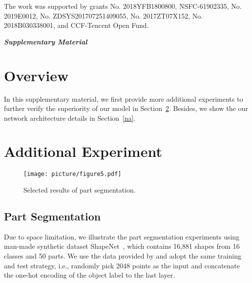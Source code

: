 \documentclass[10pt,twocolumn,letterpaper]{article}
\begin{document}
	
	
	{ The work was supported by grants No. 2018YFB1800800, NSFC-61902335, No. 2019E0012, No. ZDSYS201707251409055, No. 2017ZT07X152, No. 2018B030338001, and CCF-Tencent Open Fund.}
	
	{\footnotesize
		
		
	}
	
	\newpage
	
	\begin{center}
		{\textit{\Large\bf Supplementary Material}}
	\end{center}
	
	\maketitle
	
	\thispagestyle{empty}
	\setcounter{section}{0}
	\setcounter{figure}{0}
	\setcounter{table}{0}
	\renewcommand\thesection{\Alph{section}}


	
	\section{Overview}
	In this supplementary material, we first provide more additional experiments to further verify the superiority of our model in Section~\ref{ae}. Besides, we show the our network architecture details in Section~\ref{na}.
	
	
	
	\section{Additional Experiment}
	\label{ae}
\begin{figure}[b]
		\begin{center}
			\texttt{[image: picture/figure5.pdf]}
		\end{center}
		\caption{ {Selected results of part segmentation}.}
		\label{fig:sp_fig2}
	\end{figure}
	\subsection{Part Segmentation}
	Due to space limitation, we illustrate the part segmentation experiments using man-made synthetic dataset ShapeNet~\cite{shapenet}, which contains 16,881 shapes from 16 classes and 50 parts. We use the data provided by \cite{pointnet2} and adopt the same training and test strategy, i.e., randomly pick 2048 points as the input and concatenate the one-hot encoding of the object label to the last layer.  
	
\end{document}
